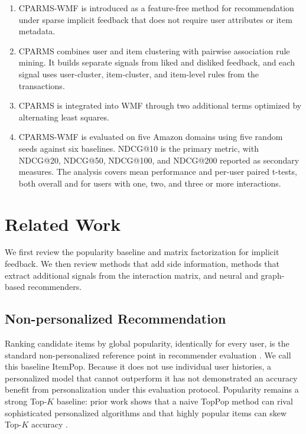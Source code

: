 \documentclass[pdflatex,sn-vancouver-num]{sn-jnl}%
\theoremstyle{thmstyleone}%
\theoremstyle{thmstyletwo}%
\theoremstyle{thmstylethree}%
\begin{document}
\begin{enumerate}
\item CPARMS-WMF is introduced as a feature-free method for recommendation under sparse implicit feedback that does not require user attributes or item metadata.

\item CPARMS combines user and item clustering with pairwise association rule mining. It builds separate signals from liked and disliked feedback, and each signal uses user-cluster, item-cluster, and item-level rules from the transactions.

\item CPARMS is integrated into WMF through two additional terms optimized by alternating least squares.

\item CPARMS-WMF is evaluated on five Amazon domains using five random seeds against six baselines. NDCG@10 is the primary metric, with NDCG@20, NDCG@50, NDCG@100, and NDCG@200 reported as secondary measures. The analysis covers mean performance and per-user paired t-tests, both overall and for users with one, two, and three or more interactions.
\end{enumerate}


\section{Related Work}\label{sec2}

We first review the popularity baseline and matrix factorization for implicit feedback. We then review methods that add side information, methods that extract additional signals from the interaction matrix, and neural and graph-based recommenders.

\subsection{Non-personalized Recommendation}

Ranking candidate items by global popularity, identically for every user, is the standard non-personalized reference point in recommender evaluation \cite{aggarwal2016recommender,zangerle2022fevr}. We call this baseline ItemPop. Because it does not use individual user histories, a personalized model that cannot outperform it has not demonstrated an accuracy benefit from personalization under this evaluation protocol. Popularity remains a strong Top-$K$ baseline: prior work shows that a naive TopPop method can rival sophisticated personalized algorithms and that highly popular items can skew Top-$K$ accuracy \cite{cremonesi2010performance}.
\end{document}
